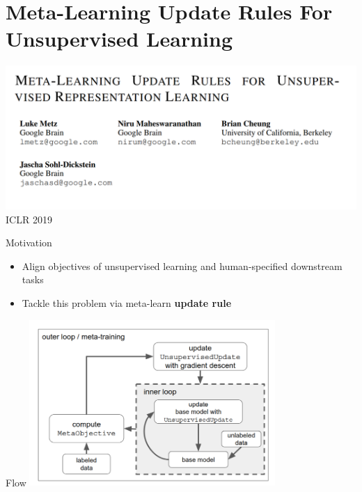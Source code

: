 \documentclass{beamer}
\begin{document}
\section{Meta-Learning Update Rules For Unsupervised Learning}
\begin{frame}
  \includegraphics[width=\textwidth]{fig/title.png}
  \center ICLR 2019
\end{frame}

\begin{frame}{Motivation}
  \begin{itemize}
    \item Align objectives of unsupervised learning and human-specified downstream tasks
    \item Tackle this problem via meta-learn \textbf{update rule}
  \end{itemize}
\end{frame}

\begin{frame}{Flow}
  \center \includegraphics[width=0.7\textwidth]{fig/flow.png}
\end{frame}
\end{document}
